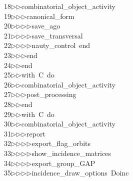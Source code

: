 \begin{tabbing}
18\>$\triangleright$\>$\triangleright$\>combinatorial\_object\_activity\ \\[0pt]
19\>$\triangleright$\>$\triangleright$\>$\triangleright$\>canonical\_form\ \\[0pt]
20\>$\triangleright$\>$\triangleright$\>$\triangleright$\>$\triangleright$\>save\_ago\ \\[0pt]
21\>$\triangleright$\>$\triangleright$\>$\triangleright$\>$\triangleright$\>save\_transversal\ \\[0pt]
22\>$\triangleright$\>$\triangleright$\>$\triangleright$\>$\triangleright$\>nauty\_control\ end\ \\[0pt]
23\>$\triangleright$\>$\triangleright$\>$\triangleright$\>end\ \\[0pt]
24\>$\triangleright$\>$\triangleright$\>end\ \\[0pt]
25\>$\triangleright$\>$\triangleright$\>with\ C\ do\ \\[0pt]
26\>$\triangleright$\>$\triangleright$\>combinatorial\_object\_activity\ \\[0pt]
27\>$\triangleright$\>$\triangleright$\>$\triangleright$\>post\_processing\ \\[0pt]
28\>$\triangleright$\>$\triangleright$\>end\ \\[0pt]
29\>$\triangleright$\>$\triangleright$\>with\ C\ do\ \\[0pt]
30\>$\triangleright$\>$\triangleright$\>combinatorial\_object\_activity\ \\[0pt]
31\>$\triangleright$\>$\triangleright$\>$\triangleright$\>report\ \\[0pt]
32\>$\triangleright$\>$\triangleright$\>$\triangleright$\>$\triangleright$\>export\_flag\_orbits\ \\[0pt]
33\>$\triangleright$\>$\triangleright$\>$\triangleright$\>$\triangleright$\>show\_incidence\_matrices\ \\[0pt]
34\>$\triangleright$\>$\triangleright$\>$\triangleright$\>$\triangleright$\>export\_group\_GAP\ \\[0pt]
35\>$\triangleright$\>$\triangleright$\>$\triangleright$\>$\triangleright$\>incidence\_draw\_options\ Doinc\ \\[0pt]

\end{tabbing}
